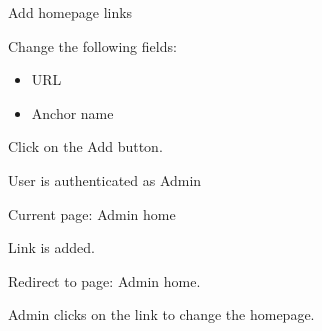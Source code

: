 
\begin{uc}{Add homepage links}

    \begin{uc-mss}
    \item Change the following fields:
    	\begin{itemize}
			\item URL
			\item Anchor name
		\end{itemize}
    \item Click on the Add button.
    \end{uc-mss}

    \begin{uc-pre}
    \item User is authenticated as Admin
    \item Current page: Admin home
    \end{uc-pre}

    \begin{uc-post}
    \item Link is added.
    \item Redirect to page: Admin home.
    \end{uc-post}

    \begin{uc-trig}
        Admin clicks on the link to change the homepage.
    \end{uc-trig}

\end{uc}
